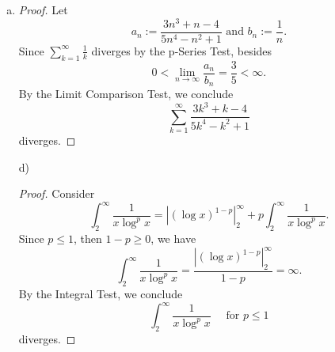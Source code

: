 \begin{Exercise}
\begin{enumerate}[a)]
\item 
\begin{proof}
Let $$a_n := \frac{3n^3+n-4}{5n^4-n^2+1}\text{ and } b_n :=\frac{1}{n}.$$
Since $\sum_{k=1}^{\infty}\frac{1}{k}$ diverges by the p-Series Test, besides
$$0<\lim_{n\to\infty}\frac{a_n}{b_n} = \frac{3}{5} < \infty.$$
By the Limit Comparison Test, we conclude $$\sum_{k=1}^{\infty}\frac{3k^3+k-4}{5k^4-k^2+1}$$ diverges.
\end{proof}

\item [d)]
\begin{proof}
Consider $$\int_{2}^{\infty}\frac{1}{x\log^p{x}} = \left|(\log{x})^{1-p}\right|_{2}^{\infty} + p\int_{2}^{\infty}\frac{1}{x\log^p{x}}.$$
Since $p \leq 1$, then $1-p \geq 0$, we have $$\int_{2}^{\infty}\frac{1}{x\log^p{x}} = \frac{\left|(\log{x})^{1-p}\right|_{2}^{\infty}}{1-p} = \infty.$$
By the Integral Test, we conclude $$\int_{2}^{\infty}\frac{1}{x\log^p{x}}\quad\mbox{ for }p \leq 1$$
diverges.
\end{proof}
\end{enumerate}
\end{Exercise}